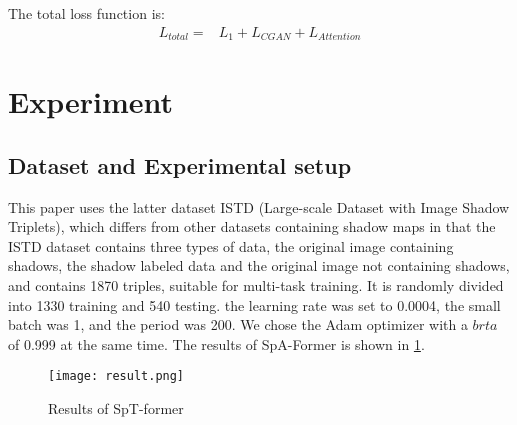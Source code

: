 \documentclass[journal]{IEEEtran}
\begin{document}
The total loss function is:
\begin{equation}
\begin{split}
L_{total}=& L_{1}+ L_{CGAN}+ L_{Attention}
\end{split}
\end{equation}


\section{Experiment}
\subsection{Dataset and Experimental setup }
This paper uses the latter dataset ISTD \cite{2} (Large-scale Dataset with Image Shadow Triplets), which differs from other datasets containing shadow maps in that the ISTD dataset contains three types of data, the original image containing shadows, the shadow labeled data and the original image not containing shadows, and contains 1870 triples, suitable for multi-task training. It is randomly divided into 1330 training and 540 testing. the learning rate was set to 0.0004, the small batch was 1, and the period was 200. We chose the Adam optimizer with a $brta$ of 0.999 at the same time. The results of SpA-Former is shown in \ref{result}.


\begin{figure}[h]
\centering
\texttt{[image: result.png]}
\caption{Results of SpT-former}
\label{result}
\end{figure}
\end{document}
